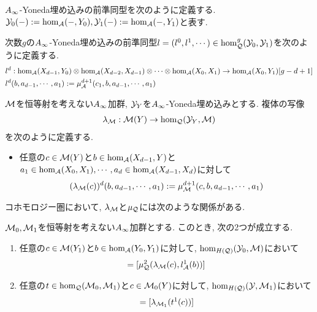 \documentclass[uplatex, a4paper, 14Q, dvipdfmx]{jsarticle}
\begin{document}
$A_{\infty}$-Yoneda埋め込みの前準同型を次のように定義する. 
$\mathcal{Y}_0(-) := \hom_{\mathcal{A}}(-,Y_0), \mathcal{Y}_1(-) := \hom_{\mathcal{A}}(-,Y_1)$と表す. 

\begin{definition}
  次数$g$の$A_{\infty}$-Yoneda埋め込みの前準同型$l =(l^0,l^1,\cdots) \in \hom^{g}_{\mathcal{Q}}(\mathcal{Y}_0,\mathcal{Y}_1)$を次のように定義する. 
  \begin{align*}
    &l^d : \hom_{\mathcal{A}}(X_{d-1},Y_0) \otimes \hom_{\mathcal{A}}(X_{d-2},X_{d-1}) \otimes \cdots \otimes \hom_{\mathcal{A}}(X_0,X_1) \to \hom_{\mathcal{A}}(X_0,Y_1)[g-d+1] \\
    &l^d(b,a_{d-1},\cdots,a_1) := \mu^{d+1}_{\mathcal{A}}(c_1,b,a_{d-1},\cdots,a_1)
  \end{align*}
\end{definition}

\begin{definition} \label{def_lambda_M}
  $\mathcal{M}$を恒等射を考えない$A_{\infty}$加群, $\mathcal{Y}_Y$を$A_{\infty}$-Yoneda埋め込みとする. 
  複体の写像
  \begin{align*}
    \lambda_{\mathcal{M}} : \mathcal{M}(Y) \to \hom_{\mathcal{Q}}(\mathcal{Y}_Y,\mathcal{M})
  \end{align*}
  を次のように定義する.
  \begin{itemize}
    \item 任意の$c \in \mathcal{M}(Y)$と$b \in \hom_{\mathcal{A}}(X_{d-1},Y)$と$a_1 \in \hom_{\mathcal{A}}(X_0,X_1), \cdots, a_d \in \hom_{\mathcal{A}}(X_{d-1},X_d)$に対して
    \begin{align*}
      (\lambda_{\mathcal{M}}(c))^d(b,a_{d-1},\cdots,a_1) := \mu^{d+1}_{\mathcal{M}}(c,b,a_{d-1},\cdots,a_1)
    \end{align*}
  \end{itemize}
\end{definition}

コホモロジー圏において, $\lambda_{\mathcal{M}}$と$\mu_{\mathcal{Q}}$には次のような関係がある. 

\begin{lemma}
  $\mathcal{M}_0,\mathcal{M}_1$を恒等射を考えない$A_{\infty}$加群とする. 
  このとき, 次の2つが成立する. 
  \begin{enumerate}
    \item 任意の$c \in \mathcal{M}(Y_1)$と$b \in \hom_{\mathcal{A}}(Y_0,Y_1)$に対して, $\hom_{H(\mathcal{Q})}(\mathcal{Y}_0, \mathcal{M})$において
    \begin{align*}
      [\lambda_\M(\mu^2_\M(c,b))]
      = [\mu^2_\Q(\lambda_\M(c), l^1_\A(b))]
    \end{align*}
    \item 任意の$t \in \hom_{\mathcal{Q}}(\mathcal{M}_0,\mathcal{M}_1)$と$c \in \mathcal{M}_0(Y)$に対して, $\hom_{H(\mathcal{Q})}(\mathcal{Y},\mathcal{M}_1)$において 
    \begin{align*}
      [\mu^2_\Q(t,\lambda_{\M_0}(c))] 
      = [\lambda_{\M_1}(t^1(c))]
    \end{align*}
  \end{enumerate}
\end{lemma}
\end{document}
